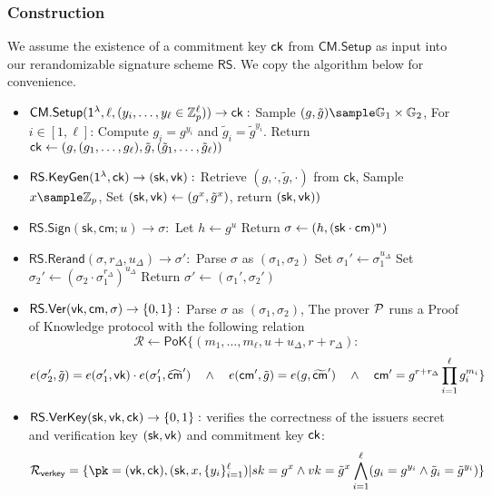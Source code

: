 \subsubsection{Construction}\label{sig-construction}
We assume the existence of a commitment key $\mathsf{ck}$ from $\mathsf{CM.Setup}$ as input into our rerandomizable signature scheme $\mathsf{RS}$. We copy the algorithm below for convenience.
\begin{itemize}
    \item $\mathsf{CM.Setup}(\mathsf{1^{\lambda}}, \ell, (y_i, \ldots, y_{\ell} \in \mathbb{Z}_p^{\ell})) \to \mathsf{ck}:$  
    Sample $(g, \tilde{g}) \sample \G_1 \times \G_2$, For $i \in [1,\ell]$: Compute $g_i = g^{y_i}$ and $\tilde{g}_i = \tilde{g}^{y_i}$. Return $\mathsf{ck} \gets (g, (g_1,\ldots,g_\ell), \tilde{g}, (\tilde{g}_1,\ldots,\tilde{g}_\ell))$
    
    \item $\mathsf{RS.KeyGen}(\mathsf{1^{\lambda}}, \mathsf{ck}) \to (\mathsf{sk}, \mathsf{vk}):$ 
        Retrieve $(g, \cdot, \tilde{g}, \cdot)$ from $\mathsf{ck}$,
        Sample $x \sample \Z_p$,
        Set $(\mathsf{sk}, \mathsf{vk}) \gets (g^x, \tilde{g}^x)$, return $(\mathsf{sk}, \mathsf{vk}))$
    
    \item $\mathsf{RS.Sign}(\mathsf{sk}, \mathsf{cm}; u) \to \sigma:$ 
        Let $h \gets g^u$
        Return $\sigma \gets (h, (\mathsf{sk} \cdot \mathsf{cm})^u)$
    
    \item $\mathsf{RS.Rerand}(\sigma, r_\Delta, u_\Delta) \to \sigma':$
        Parse $\sigma$ as $(\sigma_1, \sigma_2)$
        Set $\sigma_1' \gets \sigma_1^{u_\Delta}$
        Set $\sigma_2' \gets (\sigma_2 \cdot \sigma_1^{r_\Delta})^{u_\Delta}$
        Return $\sigma' \gets (\sigma_1', \sigma_2')$
    
    \item $\mathsf{RS.Ver}(\mathsf{vk}, \mathsf{cm}, \sigma) \to \{0,1\}:$
        Parse $\sigma$ as $(\sigma_1, \sigma_2)$, The prover $\mathcal{P}$ runs a Proof of Knowledge protocol with the following relation 
    \[
        \mathcal{R} \gets \mathsf{PoK}\{(m_1,\ldots,m_\ell, u + u_\Delta, r + r_\Delta): 
    \]
    \[
         e(\sigma_2', \tilde{g}) = e(\sigma_1', \mathsf{vk})\cdot e(\sigma_1', \widehat{\mathsf{cm}}') \quad \wedge \quad
        e(\mathsf{cm}', \tilde{g}) = e(g, \widetilde{\mathsf{cm}}') \quad \wedge \quad
        \mathsf{cm}' = g^{r + r_\Delta} \prod_{i=1}^\ell g_i^{m_i}
        \}
    \]

        \item $\mathsf{RS.VerKey}(\mathsf{sk}, \mathsf{vk}, \mathsf{ck}) \to \{0,1\}:$ verifies the correctness of the issuers secret and verification key $(\mathsf{sk}, \mathsf{vk})$ and commitment key $\mathsf{ck}$:
        \[
        \mathcal{R}_{\mathsf{verkey}} = \{\pk = (\vk, \ck),(\sk, x, \{y_i\}_{i=1}^\ell) | sk = g^x \wedge vk = \tilde{g}^x \bigwedge_{i=1}^\ell (g_i = g^{y_i} \wedge \tilde{g}_i = \tilde{g}^{y_i})\}
        \]
        
\end{itemize}




